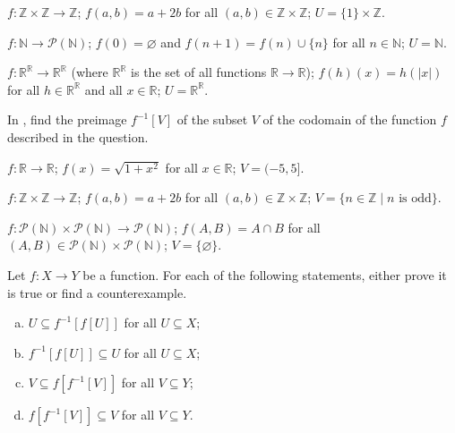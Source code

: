\begin{chapex}
$f : \mathbb{Z} \times \mathbb{Z} \to \mathbb{Z}$; $f(a,b) = a+2b$ for all $(a,b) \in \mathbb{Z} \times \mathbb{Z}$; $U = \{ 1 \} \times \mathbb{Z}$.
\end{chapex}

\begin{chapex}
$f : \mathbb{N} \to \mathcal{P}(\mathbb{N})$; $f(0) = \varnothing$ and $f(n+1) = f(n) \cup \{ n \}$ for all $n \in \mathbb{N}$; $U = \mathbb{N}$.
\end{chapex}

\begin{chapex}
$f : \mathbb{R}^{\mathbb{R}} \to \mathbb{R}^{\mathbb{R}}$ (where $\mathbb{R}^{\mathbb{R}}$ is the set of all functions $\mathbb{R} \to \mathbb{R}$); $f(h)(x) = h(|x|)$ for all $h \in \mathbb{R}^{\mathbb{R}}$ and all $x \in \mathbb{R}$; $U = \mathbb{R}^{\mathbb{R}}$.
\end{chapex}

In , find the preimage $f^{-1}[V]$ of the subset $V$ of the codomain of the function $f$ described in the question.

\begin{chapex}
\label{cqComputePreimageBegin}
$f : \mathbb{R} \to \mathbb{R}$; $f(x) = \sqrt{1+x^2}$ for all $x \in \mathbb{R}$; $V = (-5,5]$.
\end{chapex}

\begin{chapex}
$f : \mathbb{Z} \times \mathbb{Z} \to \mathbb{Z}$; $f(a,b) = a+2b$ for all $(a,b) \in \mathbb{Z} \times \mathbb{Z}$; $V = \{ n \in \mathbb{Z} \mid n \text{ is odd} \}$.
\end{chapex}

\begin{chapex}
\label{cqComputePreimageEnd}
$f : \mathcal{P}(\mathbb{N}) \times \mathcal{P}(\mathbb{N}) \to \mathcal{P}(\mathbb{N})$; $f(A,B) = A \cap B$ for all $(A,B) \in \mathcal{P}(\mathbb{N}) \times \mathcal{P}(\mathbb{N})$; $V = \{ \varnothing \}$.
\end{chapex}

\begin{chapex}
Let $f : X \to Y$ be a function. For each of the following statements, either prove it is true or find a counterexample.
\begin{multicols}{2}
\begin{enumerate}[(a)]
\item $U \subseteq f^{-1}[f[U]]$ for all $U \subseteq X$;
\item $f^{-1}[f[U]] \subseteq U$ for all $U \subseteq X$;
\item $V \subseteq f[f^{-1}[V]]$ for all $V \subseteq Y$;
\item $f[f^{-1}[V]] \subseteq V$ for all $V \subseteq Y$.
\end{enumerate}
\end{multicols}
\end{chapex}


